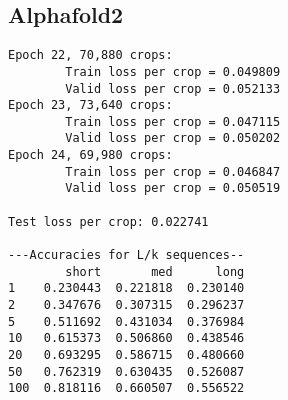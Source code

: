 \documentclass[11pt]{article}
\begin{document}
\subsection{Alphafold2}
\begin{lstlisting}
Epoch 22, 70,880 crops:
        Train loss per crop = 0.049809
        Valid loss per crop = 0.052133
Epoch 23, 73,640 crops:
        Train loss per crop = 0.047115
        Valid loss per crop = 0.050202
Epoch 24, 69,980 crops:
        Train loss per crop = 0.046847
        Valid loss per crop = 0.050519

Test loss per crop: 0.022741

---Accuracies for L/k sequences--
        short       med      long
1    0.230443  0.221818  0.230140
2    0.347676  0.307315  0.296237
5    0.511692  0.431034  0.376984
10   0.615373  0.506860  0.438546
20   0.693295  0.586715  0.480660
50   0.762319  0.630435  0.526087
100  0.818116  0.660507  0.556522
\end{lstlisting}
\end{document}
